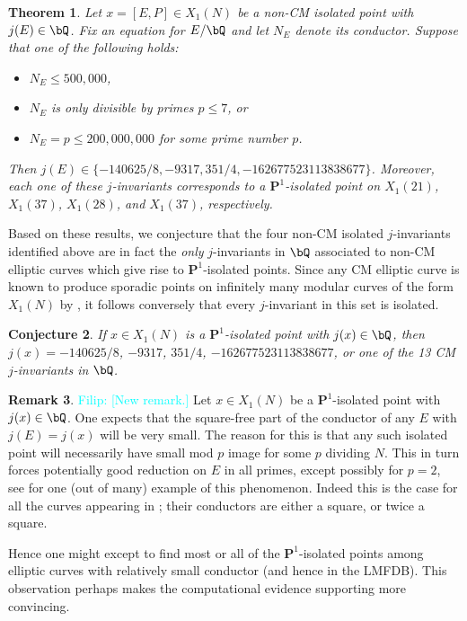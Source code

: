 \documentclass[11pt,reqno]{amsart}
\theoremstyle{plain}
\newtheorem{theorem}{Theorem}%
\newtheorem{conjecture}[theorem]{Conjecture}
\theoremstyle{definition}
\newtheorem{remark}[theorem]{Remark}
\newcommand{\Q}{\bQ}
\newcommand{\PP}{\mathbf P}
\newcommand{\filip}[1]{{\textcolor{cyan}{Filip: [#1]}}}
\begin{document}
\begin{theorem}\label{LMFDBoutputThm}
Let $x=[E,P]\in X_1(N)$ be a non-CM isolated point with $j(E) \in \Q$.
Fix an equation for $E/\Q$ and let $N_E$ denote its conductor.
Suppose that one of the following holds:
\begin{itemize}
    \item $N_E \leq 500{,}000$,
    \item $N_E$ is only divisible by primes $p \leq 7$, or
    \item $N_E=p \leq 200{,}000{,}000$ for some prime number $p$.
\end{itemize}
Then $j(E) \in \{-140625/8,-9317,351/4, -162677523113838677\}$. Moreover, each one of these $j$-invariants corresponds to a $\PP^1$-isolated point on $X_1(21)$, $X_1(37)$, $X_1(28)$, and $X_1(37)$, respectively.
\end{theorem}

Based on these results, we conjecture that the four non-CM isolated $j$-invariants identified above are in fact the \emph{only} $j$-invariants in $\Q$ associated to non-CM elliptic curves which give rise to $\PP^1$-isolated points. Since any CM elliptic curve is known to produce sporadic points on infinitely many modular curves of the form $X_1(N)$ by \cite[Theorem 7.1]{BELOV}, it follows conversely that every $j$-invariant in this set is isolated.


\begin{conjecture}\label{conj}
If $x\in X_1(N)$ is a $\PP^1$-isolated point with $j(x) \in \Q$, then $j(x)=-140625/8$, $-9317$, $351/4$, $-162677523113838677$, or one of the 13 CM $j$-invariants in $\Q$.
\end{conjecture}
\begin{remark}
\filip{New remark.}
Let $x\in X_1(N)$ be a $\PP^1$-isolated point with $j(x) \in \Q$. One expects that the square-free part of the conductor of any $E$ with $j(E)=j(x)$ will be very small.  The reason for this is that any such isolated point will necessarily have small mod $p$ image for some $p$ dividing $N$. This in turn forces potentially good reduction on $E$ in all primes, except possibly for $p=2$, see \cite[Corollary 4.4]{Mazur1978} for one (out of many) example of this phenomenon. Indeed this is the case for all the curves appearing in ; their conductors are either a square, or twice a square.

Hence one might except to find most or all of the $\PP^1$-isolated points among elliptic curves with relatively small conductor (and hence in the LMFDB). This observation perhaps makes the computational evidence supporting  more convincing.
\end{remark}
\end{document}
